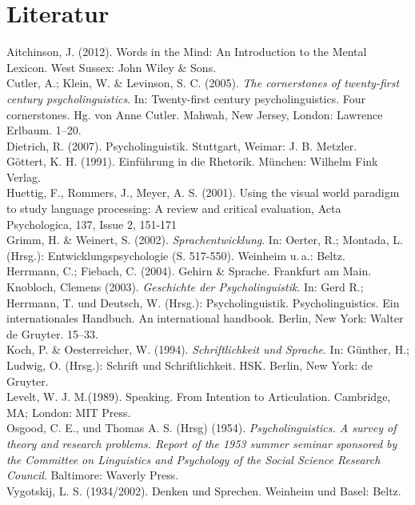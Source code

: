 \documentclass[11pt]{book}
\begin{document}
\section{Literatur}
Aitchinson, J. (2012). Words in the Mind: An Introduction to the Mental Lexicon. West Sussex: John Wiley \& Sons. \newline\\
Cutler, A.; Klein, W. \& Levinson, S. C. (2005). \textit{The cornerstones of twenty-first century psycholinguistics}. In: Twenty-first century psycholinguistics. Four cornerstones. Hg. von Anne Cutler.  Mahwah, New Jersey, London: Lawrence Erlbaum. 1–20.\newline\\
Dietrich, R. (2007). Psycholinguistik. Stuttgart, Weimar: J. B. Metzler.\newline\\
Göttert, K. H. (1991). Einführung in die Rhetorik. München: Wilhelm Fink Verlag.\newline\\
Huettig, F., Rommers, J., Meyer, A. S. (2001). Using the visual world paradigm to study language processing: A review and critical evaluation, Acta Psychologica, 137, Issue 2, 151-171\newline\\
Grimm, H. \& Weinert, S. (2002). \textit{Sprachentwicklung}. In: Oerter, R.; Montada, L. (Hrsg.): Entwicklungspsychologie (S. 517-550). Weinheim u.\,a.: Beltz.\newline\\
Herrmann, C.; Fiebach, C. (2004). Gehirn \& Sprache. Frankfurt am Main.\newline\\
Knobloch, Clemens (2003). \textit{Geschichte der Psycholinguistik}. In: Gerd R.; Herrmann, T. und Deutsch, W. (Hrsg.): Psycholinguistik. Psycholinguistics. Ein internationales Handbuch. An international handbook. Berlin, New York: Walter de Gruyter. 15–33.\newline\\
Koch, P. \& Oesterreicher, W. (1994). \textit{Schriftlichkeit und Sprache}. In: Günther, H.; Ludwig, O. (Hrsg.): Schrift und Schriftlichkeit. HSK. Berlin, New York: de Gruyter.\newline\\
Levelt, W. J. M.(1989). Speaking. From Intention to Articulation. Cambridge, MA; London: MIT Press.\newline\\
Osgood, C. E., und Thomas A. S. (Hrsg) (1954). \textit{Psycholinguistics. A survey of theory and research problems. Report of the 1953 summer seminar sponsored by the Committee on Linguistics and Psychology of the Social Science Research Council}. Baltimore: Waverly Press.\newline\\
Vygotskij, L. S. (1934/2002). Denken und Sprechen. Weinheim und Basel: Beltz.\newline\\
\end{document}
